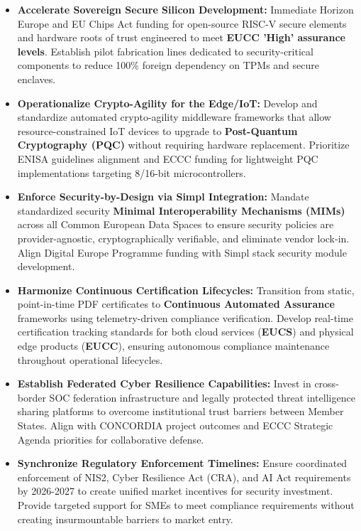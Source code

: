 \documentclass[12pt,a4paper]{article}
\begin{document}
\begin{itemize}
    \item \textbf{Accelerate Sovereign Secure Silicon Development:} Immediate Horizon Europe and EU Chips Act funding for open-source RISC-V secure elements and hardware roots of trust engineered to meet \textbf{EUCC 'High' assurance levels}. Establish pilot fabrication lines dedicated to security-critical components to reduce 100\% foreign dependency on TPMs and secure enclaves.
    
    \item \textbf{Operationalize Crypto-Agility for the Edge/IoT:} Develop and standardize automated crypto-agility middleware frameworks that allow resource-constrained IoT devices to upgrade to \textbf{Post-Quantum Cryptography (PQC)} without requiring hardware replacement. Prioritize ENISA guidelines alignment and ECCC funding for lightweight PQC implementations targeting 8/16-bit microcontrollers.
    
    \item \textbf{Enforce Security-by-Design via Simpl Integration:} Mandate standardized security \textbf{Minimal Interoperability Mechanisms (MIMs)} across all Common European Data Spaces to ensure security policies are provider-agnostic, cryptographically verifiable, and eliminate vendor lock-in. Align Digital Europe Programme funding with Simpl stack security module development.
    
    \item \textbf{Harmonize Continuous Certification Lifecycles:} Transition from static, point-in-time PDF certificates to \textbf{Continuous Automated Assurance} frameworks using telemetry-driven compliance verification. Develop real-time certification tracking standards for both cloud services (\textbf{EUCS}) and physical edge products (\textbf{EUCC}), ensuring autonomous compliance maintenance throughout operational lifecycles.
    
    \item \textbf{Establish Federated Cyber Resilience Capabilities:} Invest in cross-border SOC federation infrastructure and legally protected threat intelligence sharing platforms to overcome institutional trust barriers between Member States. Align with CONCORDIA project outcomes and ECCC Strategic Agenda priorities for collaborative defense.
    
    \item \textbf{Synchronize Regulatory Enforcement Timelines:} Ensure coordinated enforcement of NIS2, Cyber Resilience Act (CRA), and AI Act requirements by 2026-2027 to create unified market incentives for security investment. Provide targeted support for SMEs to meet compliance requirements without creating insurmountable barriers to market entry.
\end{itemize}
\end{document}
